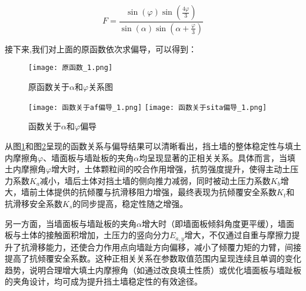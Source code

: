 \documentclass[withoutpreface,bwprint]{cumcmthesis}
\begin{document}
    \begin{equation*}
        F = \frac{\sin(\varphi) \sin\left(\frac{4\varphi}{3}\right)}{\sin(\alpha) \sin\left(\alpha+\frac{\varphi}{3}\right)}
    \end{equation*}


接下来,我们对上面的原函数依次求偏导，可以得到：
    \begin{figure}[H]
    \centering
    \texttt{[image: 原函数\_1.png]}
    \caption{原函数关于$\alpha$和$\varphi$关系图}
    \label{fig:原函数关于alpha和phi关系图}
    \end{figure}

    \begin{figure}[H]
    \centering
    {\texttt{[image: 函数关于af偏导\_1.png]}}
    {\texttt{[image: 函数关于sita偏导\_1.png]}}
    \caption{函数关于$\alpha$和$\varphi$偏导}\label{fig:双图}
    \end{figure}


从图\ref{fig:原函数关于alpha和phi关系图}和图\ref{fig:双图}呈现的函数关系与偏导结果可以清晰看出，挡土墙的整体稳定性与填土内摩擦角$\varphi$、墙面板与墙趾板的夹角$\alpha$均呈现显著的正相关关系。具体而言，当填土内摩擦角$\varphi$增大时，土体颗粒间的咬合作用增强，抗剪强度提升，使得主动土压力系数$K_a$减小，墙后土体对挡土墙的侧向推力减弱，同时被动土压力系数$K_b$增大，墙前土体提供的抗倾覆与抗滑移阻力增强，最终表现为抗倾覆安全系数$K_t$和抗滑移安全系数$K_s$的同步提高，稳定性随之增强。
\par
另一方面，当墙面板与墙趾板的夹角$\alpha$增大时（即墙面板倾斜角度更平缓），墙面板与土体的接触面积增加，土压力的竖向分力$E_{a,y}$增大，不仅通过自重与摩擦力提升了抗滑移能力，还使合力作用点向墙趾方向偏移，减小了倾覆力矩的力臂，间接提高了抗倾覆安全系数。这种正相关关系在参数取值范围内呈现连续且单调的变化趋势，说明合理增大填土内摩擦角（如通过改良填土性质）或优化墙面板与墙趾板的夹角设计，均可成为提升挡土墙稳定性的有效途径。


\end{document}

